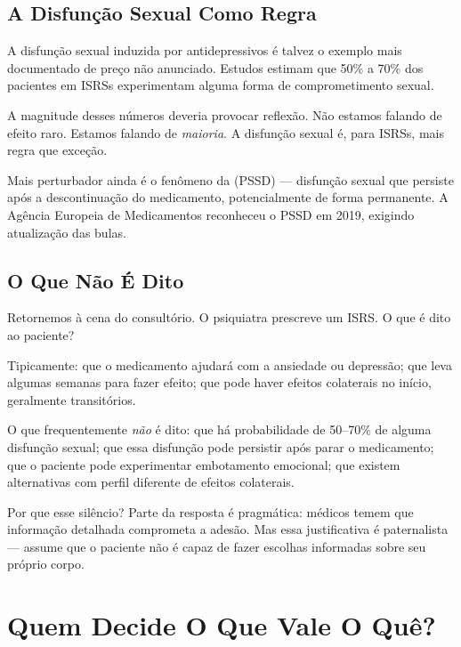 \subsection{A Disfunção Sexual Como Regra}

A disfunção sexual induzida por antidepressivos é talvez o exemplo mais documentado de preço não anunciado. Estudos estimam que 50\% a 70\% dos pacientes em ISRSs experimentam alguma forma de comprometimento sexual.

A magnitude desses números deveria provocar reflexão. Não estamos falando de efeito raro. Estamos falando de \textit{maioria}. A disfunção sexual é, para ISRSs, mais regra que exceção.

Mais perturbador ainda é o fenômeno da  (PSSD) --- disfunção sexual que persiste após a descontinuação do medicamento, potencialmente de forma permanente. A Agência Europeia de Medicamentos reconheceu o PSSD em 2019, exigindo atualização das bulas.

\subsection{O Que Não É Dito}

Retornemos à cena do consultório. O psiquiatra prescreve um ISRS. O que é dito ao paciente?

Tipicamente: que o medicamento ajudará com a ansiedade ou depressão; que leva algumas semanas para fazer efeito; que pode haver efeitos colaterais no início, geralmente transitórios.

O que frequentemente \textit{não} é dito: que há probabilidade de 50--70\% de alguma disfunção sexual; que essa disfunção pode persistir após parar o medicamento; que o paciente pode experimentar embotamento emocional; que existem alternativas com perfil diferente de efeitos colaterais.

Por que esse silêncio? Parte da resposta é pragmática: médicos temem que informação detalhada comprometa a adesão. Mas essa justificativa é paternalista --- assume que o paciente não é capaz de fazer escolhas informadas sobre seu próprio corpo.

\section{Quem Decide O Que Vale O Quê?}
\label{sec:quem-decide}

